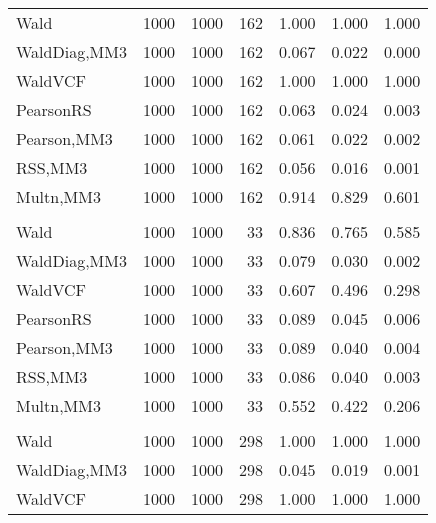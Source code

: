 \documentclass[
]{article}
\begin{document}
\begin{table}[H]
{\begin{tabular}[t]{lrrrrrr}
\hspace{1em}Wald & 1000 & 1000 & 162 & 1.000 & 1.000 & 1.000\\
\hspace{1em}WaldDiag,MM3 & 1000 & 1000 & 162 & 0.067 & 0.022 & 0.000\\
\hspace{1em}WaldVCF & 1000 & 1000 & 162 & 1.000 & 1.000 & 1.000\\
\hspace{1em}PearsonRS & 1000 & 1000 & 162 & 0.063 & 0.024 & 0.003\\
\hspace{1em}Pearson,MM3 & 1000 & 1000 & 162 & 0.061 & 0.022 & 0.002\\
\hspace{1em}RSS,MM3 & 1000 & 1000 & 162 & 0.056 & 0.016 & 0.001\\
\hspace{1em}Multn,MM3 & 1000 & 1000 & 162 & 0.914 & 0.829 & 0.601\\
\addlinespace[0.3em]
\multicolumn{7}{l}{\textbf{2F 10V}}\\
\hspace{1em}Wald & 1000 & 1000 & 33 & 0.836 & 0.765 & 0.585\\
\hspace{1em}WaldDiag,MM3 & 1000 & 1000 & 33 & 0.079 & 0.030 & 0.002\\
\hspace{1em}WaldVCF & 1000 & 1000 & 33 & 0.607 & 0.496 & 0.298\\
\hspace{1em}PearsonRS & 1000 & 1000 & 33 & 0.089 & 0.045 & 0.006\\
\hspace{1em}Pearson,MM3 & 1000 & 1000 & 33 & 0.089 & 0.040 & 0.004\\
\hspace{1em}RSS,MM3 & 1000 & 1000 & 33 & 0.086 & 0.040 & 0.003\\
\hspace{1em}Multn,MM3 & 1000 & 1000 & 33 & 0.552 & 0.422 & 0.206\\
\addlinespace[0.3em]
\multicolumn{7}{l}{\textbf{3F 15V}}\\
\hspace{1em}Wald & 1000 & 1000 & 298 & 1.000 & 1.000 & 1.000\\
\hspace{1em}WaldDiag,MM3 & 1000 & 1000 & 298 & 0.045 & 0.019 & 0.001\\
\hspace{1em}WaldVCF & 1000 & 1000 & 298 & 1.000 & 1.000 & 1.000\\

\end{tabular}}
\end{table}
\end{document}
